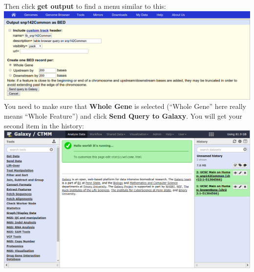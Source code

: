 \documentclass[11pt,a4paper]{article}
\begin{document}
Then click \textbf{get output} to find a menu similar to this:\\
\includegraphics[width=\textwidth]{figures/101_07}\\
You need to make sure that \textbf{Whole Gene} is selected (``Whole Gene'' here really means ``Whole Feature'') and click \textbf{Send Query to Galaxy}. You will get your second item in the history:\\
\includegraphics[width=\textwidth]{figures/101_08}\\


%
%

\newpage

\vspace{-1.5em}

\end{document}
